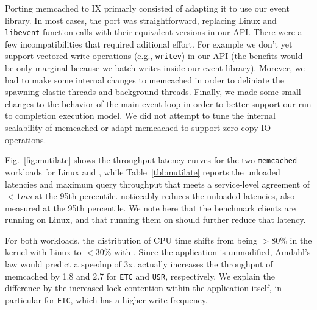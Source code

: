  Porting memcached to IX primarly consisted of adapting it
to use our event library. In most cases, the port was straightforward,
replacing Linux and \texttt{libevent} function calls with their equivalent
versions in our API. There were a few incompatibilities that required
aditional effort. For example we don't yet support vectored write
operations (e.g., \texttt{writev}) in our
API (the benefits would be only marginal because we batch
writes inside our event library). Morever, we had to make some internal changes
to memcached in order to deliniate the spawning elastic threads and background
threads.   Finally, we made some small changes to the behavior of the main
event loop in order to better support our run to completion execution model. We
did not attempt to tune the internal scalability of memcached or adapt memcached
to support zero-copy IO operations.



 Fig.~\ref{fig:mutilate} shows the throughput-latency curves for the
two \texttt{memcached} workloads for Linux and \ix, while
Table~\ref{tbl:mutilate} reports the unloaded latencies and maximum query throughput that meets a service-level agreement of $<1ms$ at the 95th percentile.
\ix noticeably reduces the unloaded latencies, also measured
at the 95th percentile.  We note here that the benchmark
clients are running on Linux, and that running them on \ix should
further reduce that latency. 

For both workloads, the distribution of CPU time shifts from being
$>80\%$ in the kernel with Linux to $<30\%$ with \ix.  Since the
application is unmodified, Amdahl's law would predict a speedup of 3x.
\ix actually increases the throughput of memcached by 1.8 and 2.7
for \texttt{ETC} and \texttt{USR}, respectively.  We explain the
difference by the increased lock contention within the application
itself, in particular for \texttt{ETC}, which has a higher write frequency.


%

